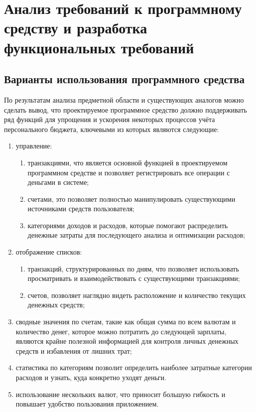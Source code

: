 \section{Анализ требований к программному средству и разработка функциональных требований}
\label{sec:domain}

\subsection{Варианты использования программного средства}
\label{sec:domain:use_cases}

По результатам анализа предметной области и существующих аналогов можно сделать вывод, что проектируемое программное средство должно поддерживать ряд функций для упрощения и ускорения некоторых процессов учёта персонального бюджета, ключевыми из которых являются следующие:

\begin{enumerate}
    \item управление:
    \begin{enumerate}
        \item транзакциями, что является основной функцией в проектируемом программном средстве и позволяет регистрировать все операции с деньгами в системе;
        \item счетами, это позволяет полностью манипулировать существующими источниками средств пользователя;
        \item категориями доходов и расходов, которые помогают распределить денежные затраты для последующего анализа и оптимизации расходов;
    \end{enumerate}
    \item отображение списков:
    \begin{enumerate}
        \item транзакций, структурированных по дням, что позволяет использовать просматривать и взаимодействовать с существующими транзакциями;
        \item счетов, позволяет наглядно видеть расположение и количество текущих денежных средств;
    \end{enumerate}
    \item сводные значения по счетам, такие как общая сумма по всем валютам и количество денег, которое можно потратить до следующей зарплаты, являются крайне полезной информацией для контроля личных денежных средств и избавления от лишних трат;
    \item статистика по категориям позволит определить наиболее затратные категории расходов и узнать, куда конкретно уходят деньги.
    \item использование нескольких валют, что приносит большую гибкость и повышает удобство пользования приложением.
\end{enumerate}

